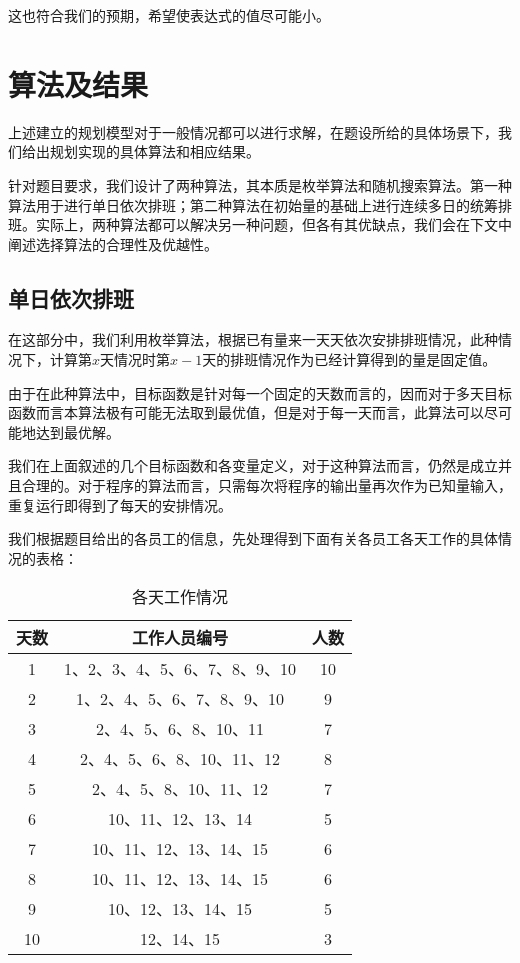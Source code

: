 \documentclass{article}
\begin{document}
	这也符合我们的预期，希望使表达式的值尽可能小。
	
	\newpage
	\section{算法及结果}
	
	上述建立的规划模型对于一般情况都可以进行求解，在题设所给的具体场景下，我们给出规划实现的具体算法和相应结果。
	
	针对题目要求，我们设计了两种算法，其本质是枚举算法和随机搜索算法。第一种算法用于进行单日依次排班；第二种算法在初始量的基础上进行连续多日的统筹排班。实际上，两种算法都可以解决另一种问题，但各有其优缺点，我们会在下文中阐述选择算法的合理性及优越性。
	\subsection{单日依次排班}
	在这部分中，我们利用枚举算法，根据已有量来一天天依次安排排班情况，此种情况下，计算第$x$天情况时第$x-1$天的排班情况作为已经计算得到的量是固定值。
	
	由于在此种算法中，目标函数是针对每一个固定的天数而言的，因而对于多天目标函数而言本算法极有可能无法取到最优值，但是对于每一天而言，此算法可以尽可能地达到最优解。
	
	我们在上面叙述的几个目标函数和各变量定义，对于这种算法而言，仍然是成立并且合理的。对于程序的算法而言，只需每次将程序的输出量再次作为已知量输入，重复运行即得到了每天的安排情况。
	
	我们根据题目给出的各员工的信息，先处理得到下面有关各员工各天工作的具体情况的表格：
	\begin{table}[h]
		\centering
		\caption{各天工作情况}
		\begin{tabular}{|c|c|c|}
			\hline
			天数 & 工作人员编号               & 人数 \\
			\hline
			1  & 1、2、3、4、5、6、7、8、9、10 & 10 \\
			2  & 1、2、4、5、6、7、8、9、10   & 9  \\
			3  & 2、4、5、6、8、10、11      & 7  \\
			4  & 2、4、5、6、8、10、11、12   & 8  \\
			5  & 2、4、5、8、10、11、12     & 7  \\
			6  & 10、11、12、13、14       & 5  \\
			7  & 10、11、12、13、14、15    & 6  \\
			8  & 10、11、12、13、14、15    & 6  \\
			9  & 10、12、13、14、15       & 5  \\
			10 & 12、14、15             & 3 \\
			\hline
		\end{tabular}
	\end{table}
	
\end{document}
